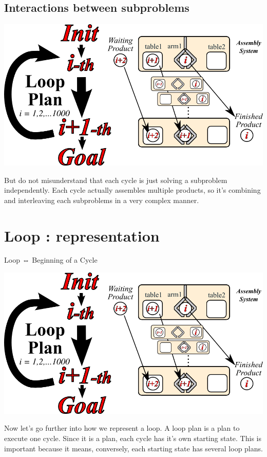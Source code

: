 \subsection{Interactions between subproblems}
\label{sec-4-2}
\includegraphics[width=\textwidth]{img/cyclic-planning.png}

\begin{resume}
But do not misunderstand that
each cycle is just solving a subproblem independently.
Each cycle actually assembles multiple products,
so it's combining and interleaving each subproblems
in a very complex manner.
\end{resume}

\section{Loop : representation}
\label{sec-5}

Loop ⇔ Beginning of a Cycle

\includegraphics[width=\textwidth]{img/cyclic-planning.png}

\begin{resume}
Now let's go further into how we represent a loop.
A loop plan is a plan to execute one cycle.
Since it is a plan, each cycle has it's own starting state.
This is important because it means, conversely, each starting state has
several loop plans.
\end{resume}

